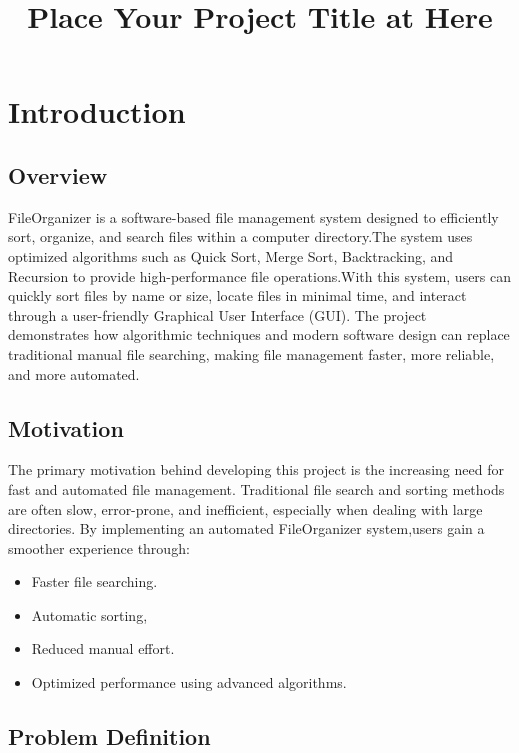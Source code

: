 \documentclass[12pt]{report}
\title{Place Your Project Title at Here}
\begin{document}
    
    \tableofcontents
  


\newpage
\chapter{Introduction}

\section{Overview}
FileOrganizer is a software-based file management system designed to efficiently sort, organize, and search files within a computer directory.The system uses optimized algorithms such as Quick Sort, Merge Sort, Backtracking, and Recursion to provide high-performance file operations.With this system, users can quickly sort files by name or size, locate files in minimal time, and interact through a user-friendly Graphical User Interface (GUI). The project demonstrates how algorithmic techniques and modern software design can replace traditional manual file searching, making file management faster, more reliable, and more automated.

\section{Motivation}
The primary motivation behind developing this project is the increasing need for fast and automated file management. Traditional file search and sorting methods are often slow, error-prone, and inefficient, especially when dealing with large directories.
By implementing an automated FileOrganizer system,users gain a smoother experience through:
\begin{itemize}
    \item Faster file searching.
    \item Automatic sorting,
    \item Reduced manual effort.
    \item Optimized performance using advanced algorithms.
\end{itemize}


\section{Problem Definition}
\end{document}

